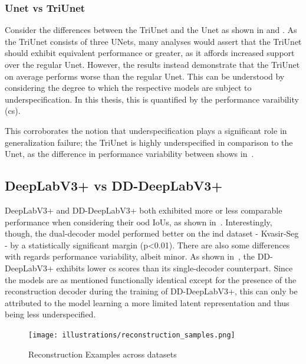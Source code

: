     \subsubsection{Unet vs TriUnet}
    Consider the differences between the TriUnet and the Unet as shown in  and . As the TriUnet consists of three UNets, many analyses would assert that the TriUnet should exhibit equivalent performance or greater, as it affords increased support over the regular Unet. However, the results instead demonstrate that the TriUnet on average performs worse than the regular Unet. This can be understood by considering the degree to which the respective models are subject to underspecification. In this thesis, this is quantified by the performance varaibility (\gls{cs}). 
    
    This corroborates the notion that underspecification plays a significant role in generalization failure; the TriUnet is highly underspecified in comparison to the Unet, as the difference in performance variability between shows in~.
    
    \subsection{DeepLabV3+ vs DD-DeepLabV3+} \label{dd-deeplab}
    DeepLabV3+ and DD-DeepLabV3+ both exhibited more or less comparable performance when considering their \gls{ood} IoUs, as shown in~. Interestingly, though, the dual-decoder model performed better on the \gls{ind} dataset - Kvasir-Seg - by a statistically significant margin (p<0.01). There are also some differences with regards performance variability, albeit minor. As shown in~, the DD-DeepLabV3+ exhibits lower \gls{cs} scores than its single-decoder counterpart. Since the models are as mentioned functionally identical except for the presence of the reconstruction decoder during the training of DD-DeepLabV3+, this can only be attributed to the model learning a more limited latent representation and thus being less underspecified. 
    
    \begin{figure}[htb]
        \centering
        \texttt{[image: illustrations/reconstruction\_samples.png]}
        \caption{Reconstruction Examples across datasets}
        \label{fig:reconstruction}
    \end{figure}

